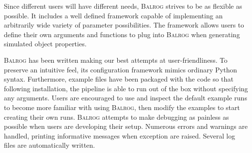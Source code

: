 \documentclass[11pt]{book}
\newcommand{\py}{Python}
\newcommand{\balrog}{\textsc{Balrog}}
\begin{document}
Since different users will have different needs, \balrog{} strives to be as flexible as possible. 
It includes a well defined framework capable of implementing an arbitrarily wide variety of parameter possibilities.
The framework allows users to define their own arguments and functions to plug into \balrog{} when generating simulated object properties.

\balrog{} has been written making our best attempts at user-friendliness.
To preserve an intuitive feel, its configuration framework mimics ordinary \py{} syntax. 
Furthermore, example files have been packaged with the code so that following installation,
the pipeline is able to run out of the box without specifying any arguments.
Users are encouraged to use and inspect the default example runs to become more familiar with using \balrog{},
then modify the examples to start creating their own runs.
\balrog{} attempts to make debugging as painless as possible when users are developing their setup.
Numerous errors and warnings are handled, printing informative messages when exception are raised.
Several log files are automatically written.
\end{document}
